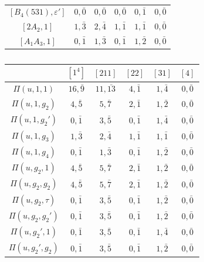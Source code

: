 \begin{landscape}
\begin{table}[h]
\begin{minipage}{0.4\textwidth}
\begin{tabular}{|c|ccccc|}
                $[B_4(531),\varepsilon']$ & $0,\bar0$ & $0,\bar0$ & $0,\bar0$ & $0,\bar1$ & $0,\bar0$ \\
                $[2A_2,1]$ & $1,\bar{3}$ & $2,\bar{4}$ & $1,\bar1$ & $1,\bar1$ & $0,\bar0$ \\
                $[A_1A_3,1]$ & $0,\bar1$ & $1,\bar{3}$ & $0,\bar1$ & $1,\bar2$ & $0,\bar0$ \\\hline
            \end{tabular}
            \caption{}
        \end{minipage}
        \hspace{3cm} %
        \begin{minipage}{0.4\textwidth}
            \centering
            \begin{tabular}{|c|ccccc|}
                \hline
                & $[1^4]$ & $[211]$ & $[22]$ & $[31]$ & $[4]$ \\\hline
                $\Pi(u,1,1)$ & $16,\bar{9}$ & $11,\bar{13}$ & $4,\bar1$ & $1,\bar{4}$ & $0,\bar0$ \\
                $\Pi(u,1,g_2)$ & $4,\bar{5}$ & $5,\bar{7}$ & $2,\bar1$ & $1,\bar2$ & $0,\bar0$ \\
                $\Pi(u,1,g_2')$ & $0,\bar1$ & $3,\bar{5}$ & $0,\bar1$ & $1,\bar{4}$ & $0,\bar0$ \\
                $\Pi(u,1,g_3)$ & $1,\bar{3}$ & $2,\bar{4}$ & $1,\bar1$ & $1,\bar1$ & $0,\bar0$ \\
                $\Pi(u,1,g_4)$ & $0,\bar1$ & $1,\bar{3}$ & $0,\bar1$ & $1,\bar2$ & $0,\bar0$ \\\hline
                $\Pi(u,g_2,1)$ & $4,\bar{5}$ & $5,\bar{7}$ & $2,\bar1$ & $1,\bar2$ & $0,\bar0$ \\
                $\Pi(u,g_2,g_2)$ & $4,\bar{5}$ & $5,\bar{7}$ & $2,\bar1$ & $1,\bar2$ & $0,\bar0$ \\
                $\Pi(u,g_2,\tau)$ & $0,\bar1$ & $3,\bar{5}$ & $0,\bar1$ & $1,\bar2$ & $0,\bar0$ \\
                $\Pi(u,g_2,g_2')$ & $0,\bar1$ & $3,\bar{5}$ & $0,\bar1$ & $1,\bar2$ & $0,\bar0$ \\\hline
                $\Pi(u,g_2',1)$ & $0,\bar1$ & $3,\bar{5}$ & $0,\bar1$ & $1,\bar{4}$ & $0,\bar0$ \\
                $\Pi(u,g_2',g_2)$ & $0,\bar1$ & $3,\bar{5}$ & $0,\bar1$ & $1,\bar2$ & $0,\bar0$ \\

\end{tabular}
\end{minipage}
\end{table}
\end{landscape}
